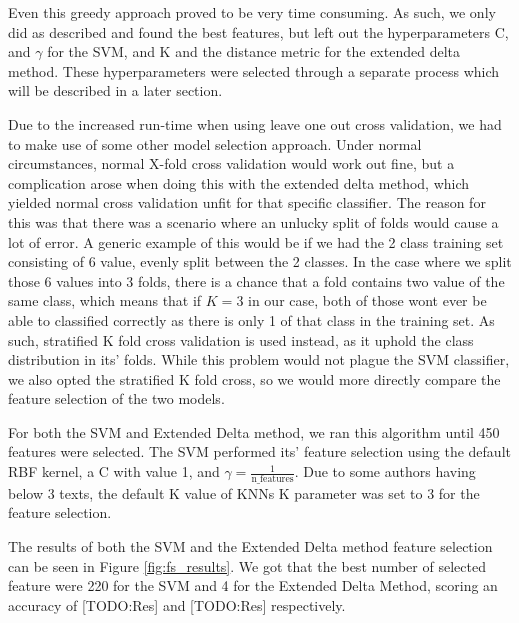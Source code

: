 Even this greedy approach proved to be very time consuming. As such, we only did
as described and found the best features, but left out the hyperparameters C,
and $\gamma$ for the SVM, and K and the distance metric for the extended delta
method. These hyperparameters were selected through a separate process
which will be described in a later section.

Due to the increased run-time when using leave one out cross validation, we had
to make use of some other model selection approach. Under normal circumstances,
normal X-fold cross validation would work out fine, but a complication arose
when doing this with the extended delta method, which yielded normal cross
validation unfit for that specific classifier. The reason for this was that
there was a scenario where an unlucky split of folds would cause a lot of error.
A generic example of this would be if we had the 2 class training set consisting
of 6 value, evenly split between the 2 classes. In the case where we split those
6 values into 3 folds, there is a chance that a fold contains two value of the
same class, which means that if $K = 3$ in our case, both of those wont ever be
able to classified correctly as there is only 1 of that class in the training
set. As such, stratified K fold cross validation is used instead, as it uphold
the class distribution in its' folds. While this problem would not plague the
SVM classifier, we also opted the stratified K fold cross, so we would more
directly compare the feature selection of the two models.

For both the \gls{SVM} and Extended Delta method, we ran this algorithm
until 450 features were selected. The SVM performed its' feature
selection using the default RBF kernel, a C with value 1, and $\gamma =
\frac{1}{\text{n\_features}}$. Due to some authors having below 3 texts,
the default K value of \gls{KNN}s K parameter was set to 3 for the feature
selection.

The results of both the SVM and the Extended Delta method feature selection can
be seen in Figure \ref{fig:fs_results}. We got that the best number of selected
feature were 220 for the SVM and 4 for the Extended Delta Method, scoring an
accuracy of [TODO:Res] and [TODO:Res] respectively.

